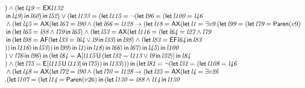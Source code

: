 \documentclass{article}
\newcommand{\U}{\,\mbox{\sf{U}}\,}
\newcommand{\A}{\mbox{\sf{A}}}
\newcommand{\E}{\mbox{\sf{E}}}
\newcommand{\AX}{\mbox{\sf{AX}}}
\newcommand{\EX}{\mbox{\sf{EX}}}
\newcommand{\AF}{\mbox{\sf{AF}}}
\newcommand{\EF}{\mbox{\sf{EF}}}
\newcommand{\mita}[1]{\mbox{\it{{#1}}}}
\newcommand{\msf}[1]{\mbox{\sf{{#1}}}}
\begin{document}
\[\begin{array}{l}
) \wedge (\mita{\sf{let}} \, \mita{l49} = \EX\mita{l132}\\\mbox{} \, \mita{\sf{in}} \, \mita{l49}
) \, \mita{\sf{in}} \, \mita{l60}
) \, \mita{\sf{in}} \, \mita{l52}
) \vee (\mita{\sf{let}} \, \mita{l133} = (\mita{\sf{let}} \, \mita{l115} = \neg (\mita{\sf{let}} \, \mita{l96} = (\mita{\sf{let}} \, \mita{l100} = \mita{l46}\\\mbox{} \wedge (\mita{\sf{let}} \, \mita{l45} = \AX(\mita{\sf{let}} \, \mita{l67} = \mita{l90} \wedge (\mita{\sf{let}} \, \mita{l66} = \mita{l128} \rightarrow (\mita{\sf{let}} \, \mita{l18} = \AX(\mita{\sf{let}} \, \mita{l1} = \exists \mita{v9} . (\mita{\sf{let}} \, \mita{l99} = (\mita{\sf{let}} \, \mita{l79} = \msf{Paren}(v9)\\\mbox{} \, \mita{\sf{in}} \, (\mita{\sf{let}} \, \mita{l65} = \mita{l88} \wedge \mita{l79} \, \mita{\sf{in}} \, \mita{l65}
) \wedge (\mita{\sf{let}} \, \mita{l53} = \AX(\mita{\sf{let}} \, \mita{l116} = (\mita{\sf{let}} \, \mita{l64} = \mita{l27} \wedge \mita{l79}\\\mbox{} \, \mita{\sf{in}} \, (\mita{\sf{let}} \, \mita{l98} = \AF(\mita{\sf{let}} \, \mita{l33} = \mita{l64} \vee \mita{l9} \, \mita{\sf{in}} \, \mita{l33}
) \, \mita{\sf{in}} \, \mita{l98}
) \wedge (\mita{\sf{let}} \, \mita{l83} = \EF\mita{l64} \, \mita{\sf{in}} \, \mita{l83}\\\mbox{}
)
) \, \mita{\sf{in}} \, \mita{l116}
) \, \mita{\sf{in}} \, \mita{l53}
)
) \, \mita{\sf{in}} \, \mita{l99}
) \, \mita{\sf{in}} \, \mita{l1}
) \, \mita{\sf{in}} \, \mita{l18}
) \, \mita{\sf{in}} \, \mita{l66}
) \, \mita{\sf{in}} \, \mita{l67}
) \, \mita{\sf{in}} \, \mita{l45}
) \, \mita{\sf{in}} \, \mita{l100}\\\mbox{}
) \vee \mita{l76} \, \mita{\sf{in}} \, \mita{l96}
) \, \mita{\sf{in}} \, (\mita{\sf{let}} \, \mita{l84} = \A[\mita{l115} \U (\mita{\sf{let}} \, \mita{l32} = \mita{l113} \vee \mita{l9} \, \mita{\sf{in}} \, \mita{l32}
)]
 \, \mita{\sf{in}} \, \mita{l84}\\\mbox{}
) \wedge (\mita{\sf{let}} \, \mita{l75} = \E[\mita{l115} \U \mita{l113}]
 \, \mita{\sf{in}} \, \mita{l75}
)
) \, \mita{\sf{in}} \, \mita{l133}
)
)
) \, \mita{\sf{in}} \, (\mita{\sf{let}} \, \mita{l81} = \neg (\mita{\sf{let}} \, \mita{l31} = (\mita{\sf{let}} \, \mita{l108} = \mita{l46}\\\mbox{} \wedge (\mita{\sf{let}} \, \mita{l48} = \AX(\mita{\sf{let}} \, \mita{l72} = \mita{l90} \wedge (\mita{\sf{let}} \, \mita{l70} = \mita{l128} \rightarrow (\mita{\sf{let}} \, \mita{l25} = \AX(\mita{\sf{let}} \, \mita{l4} = \exists \mita{v26}\\\mbox{} . (\mita{\sf{let}} \, \mita{l107} = (\mita{\sf{let}} \, \mita{l14} = \msf{Paren}(v26) \, \mita{\sf{in}} \, (\mita{\sf{let}} \, \mita{l130} = \mita{l88} \wedge \mita{l14} \, \mita{\sf{in}} \, \mita{l130}

\end{array}\]
\end{document}
